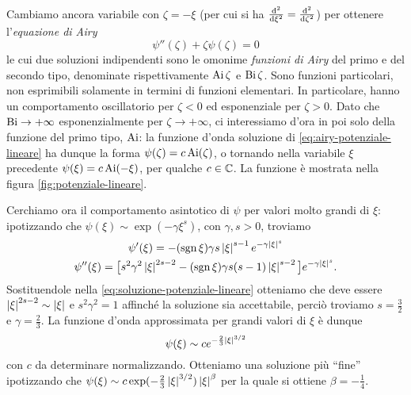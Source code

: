 Cambiamo ancora variabile con $\zeta=-\xi$ (per cui si ha $\frac{\textup{d}^2 {}}{\textup{d} {\xi}^2}=\frac{\textup{d}^2 {}}{\textup{d} {\zeta}^2}$) per ottenere l'\emph{equazione di Airy}
\begin{equation}
	\psi''(\zeta)+\zeta\psi(\zeta)=0
	\label{eq:airy-potenziale-lineare}
\end{equation}
le cui due soluzioni indipendenti sono le omonime \emph{funzioni di Airy} del primo e del secondo tipo, denominate rispettivamente $\operatorname{Ai}\zeta$ e $\operatorname{Bi}\zeta$.
Sono funzioni particolari, non esprimibili solamente in termini di funzioni elementari.
In particolare, hanno un comportamento oscillatorio per $\zeta<0$ ed esponenziale per $\zeta>0$.
Dato che $\operatorname{Bi}\to+\infty$ esponenzialmente per $\zeta\to+\infty$, ci interessiamo d'ora in poi solo della funzione del primo tipo, $\operatorname{Ai}$: la funzione d'onda soluzione di \eqref{eq:airy-potenziale-lineare} ha dunque la forma $\psi(\zeta)=c\operatorname{Ai}(\zeta)$, o tornando nella variabile $\xi$ precedente $\psi(\xi)=c\operatorname{Ai}(-\xi)$, per qualche $c\in\mathbb{C}$.
La funzione è mostrata nella figura \ref{fig:potenziale-lineare}.


Cerchiamo ora il comportamento asintotico di $\psi$ per valori molto grandi di $\xi$: ipotizzando che $\psi(\xi)\sim\exp(-\gamma{\xi}^s)$, con $\gamma,s>0$, troviamo
\begin{gather*}
	\psi'(\xi)=-(\operatorname{sgn}\xi)\gamma s\left|{\xi}\right|^{s-1}e^{-\gamma\left|{\xi}\right|^s}\\
	\psi''(\xi)=\big[s^2\gamma^2\left|{\xi}\right|^{2s-2}-(\operatorname{sgn}\xi)\gamma s(s-1)\left|{\xi}\right|^{s-2}\big]e^{-\gamma\left|{\xi}\right|^s}.
\end{gather*}
Sostituendole nella \eqref{eq:soluzione-potenziale-lineare} otteniamo che deve essere $\left|{\xi}\right|^{2s-2}\sim\left|{\xi}\right|$ e $s^2\gamma^2=1$ affinch\'e la soluzione sia accettabile, perciò troviamo $s=\frac32$ e $\gamma=\frac23$.
La funzione d'onda approssimata per grandi valori di $\xi$ è dunque
\begin{equation}
	\psi(\xi)\sim ce^{-\frac23\left|{\xi}\right|^{3/2}}
\end{equation}
con $c$ da determinare normalizzando.
Otteniamo una soluzione più ``fine'' ipotizzando che $\psi(\xi)\sim c\exp(-\frac23\left|{\xi}\right|^{3/2})\left|{\xi}\right|^\beta$ per la quale si ottiene $\beta=-\frac14$.

